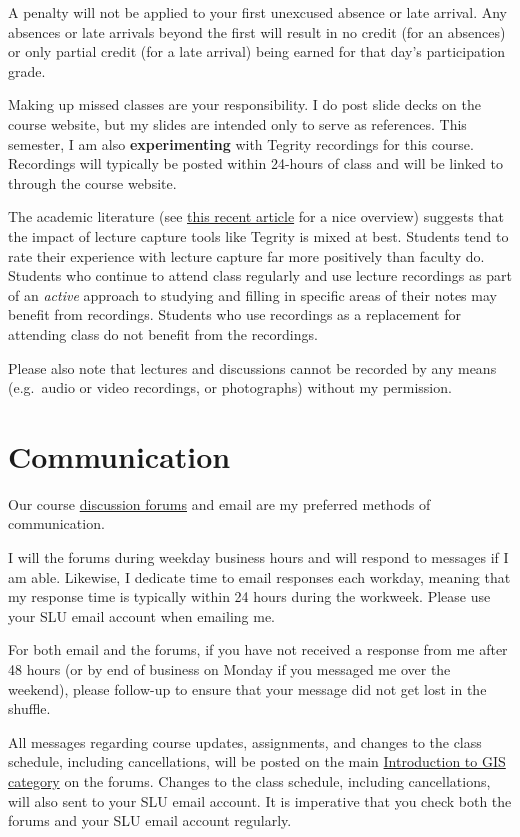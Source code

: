 \documentclass[]{book}
\begin{document}
A penalty will not be applied to your first unexcused absence or late arrival. Any absences or late arrivals beyond the first will result in no credit (for an absences) or only partial credit (for a late arrival) being earned for that day's participation grade.

Making up missed classes are your responsibility. I do post slide decks on the course website, but my slides are intended only to serve as references. This semester, I am also \textbf{experimenting} with Tegrity recordings for this course. Recordings will typically be posted within 24-hours of class and will be linked to through the course website.

The academic literature (see \href{https://link.springer.com/article/10.1007/s10734-018-0275-9}{this recent article} for a nice overview) suggests that the impact of lecture capture tools like Tegrity is mixed at best. Students tend to rate their experience with lecture capture far more positively than faculty do. Students who continue to attend class regularly and use lecture recordings as part of an \emph{active} approach to studying and filling in specific areas of their notes may benefit from recordings. Students who use recordings as a replacement for attending class do not benefit from the recordings.

Please also note that lectures and discussions cannot be recorded by any means (e.g.~audio or video recordings, or photographs) without my permission.

\hypertarget{communication}{%
\section{Communication}\label{communication}}

Our course \href{http://discuss.slu-ssds.org}{discussion forums} and email are my preferred methods of communication.

I will the forums during weekday business hours and will respond to messages if I am able. Likewise, I dedicate time to email responses each workday, meaning that my response time is typically within 24 hours during the workweek. Please use your SLU email account when emailing me.

For both email and the forums, if you have not received a response from me after 48 hours (or by end of business on Monday if you messaged me over the weekend), please follow-up to ensure that your message did not get lost in the shuffle.

All messages regarding course updates, assignments, and changes to the class schedule, including cancellations, will be posted on the main \href{https://discuss.slu-ssds.org/c/intro-to-gis}{Introduction to GIS category} on the forums. Changes to the class schedule, including cancellations, will also sent to your SLU email account. It is imperative that you check both the forums and your SLU email account regularly.
\end{document}
